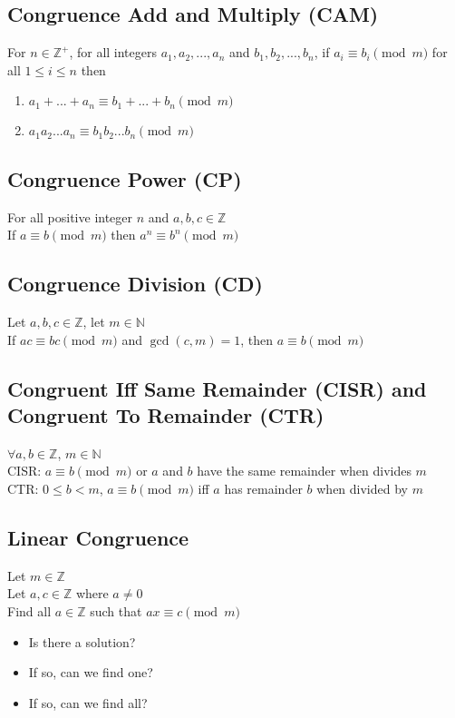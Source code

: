 \documentclass[12pt, letterpaper]{article}
\begin{document}
\subsection{Congruence Add and Multiply (CAM)}
For $n \in \mathbb{Z^+}$, for all integers $a_1, a_2, ... , a_n$ and $b_1, b_2, ... , b_n$, if $a_i \equiv b_i \pmod{m}$ for all $1 \leq i \leq n$ then
\begin{enumerate}
    \item $a_1+ ... +a_n \equiv b_1+ ... +b_n \pmod{m}$
    \item $a_1a_2...a_n \equiv b_1b_2...b_n \pmod{m}$
\end{enumerate}
\subsection{Congruence Power (CP)}
For all positive integer $n$ and $a,b,c \in \mathbb{Z}$ \\
If $a \equiv b \pmod{m}$ then $a^n \equiv b^n \pmod{m}$ 
\subsection{Congruence Division (CD)}
Let $a,b,c \in \mathbb{Z}$, let $m \in \mathbb{N}$ \\
If $ac \equiv bc \pmod{m}$ and $\gcd(c, m) = 1$, then $a \equiv b \pmod{m}$ 
\subsection{Congruent Iff Same Remainder (CISR) and Congruent To Remainder (CTR)}
$\forall a,b \in \mathbb{Z}$, $m \in \mathbb{N}$ \\
CISR: $a \equiv b \pmod{m}$ or $a$ and $b$ have the same remainder when divides $m$ \\
CTR: $0 \leq b < m$, $a \equiv b \pmod{m}$ iff $a$ has remainder $b$ when divided by $m$
\subsection{Linear Congruence}
Let $m \in \mathbb{Z}$ \\
Let $a,c \in \mathbb{Z}$ where $a \neq 0$ \\ 
Find all $a \in \mathbb{Z}$ such that $ax \equiv c \pmod{m}$
\begin{itemize}
    \item Is there a solution?
    \item If so, can we find one?
    \item If so, can we find all?
\end{itemize}
\end{document}
